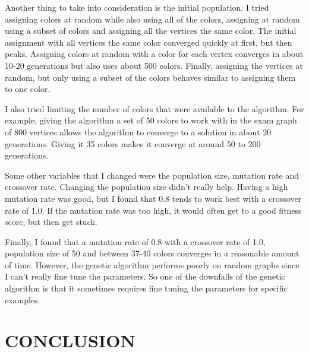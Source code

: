 \documentclass[12]{article}
\begin{document}
Another thing to take into consideration is the initial population. I tried assigning colors at random while also using all of the colors, assigning at random using a subset of colors and assigning all the vertices the same color. The initial assignment with all vertices the same color converged quickly at first, but then peaks. Assigning colors at random with a color for each vertex converges in about 10-20 generations but also uses about 500 colors. Finally, assigning the vertices at random, but only using a subset of the colors behaves similar to assigning them to one color.

I also  tried limiting the number of colors that were available to the algorithm. For example, giving the algorithm a set of 50 colors to work with in the exam graph of 800 vertices allows the algorithm to converge to a solution in about 20 generations. Giving it 35 colors makes it converge at around 50 to 200 generations.

Some other variables that I changed were the population size, mutation rate and crossover rate. Changing the population size didn't really help. Having a high mutation rate was good, but I found that 0.8 tends to work best with a crossover rate of 1.0. If the mutation rate was too high, it would often get to a good fitness score, but then get stuck.

Finally, I found that a mutation rate of 0.8 with a crossover rate of 1.0, population size of 50 and between 37-40 colors converges in a reasonable amount of time. However, the genetic algorithm performs poorly on random graphs since I can't really fine tune the parameters. So one of the downfalls of the genetic algorithm is that it sometimes requires fine tuning the parameters for specific examples.
\section{CONCLUSION}
\newpage
\end{document}
